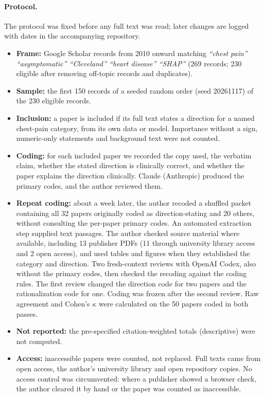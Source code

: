 \documentclass[11pt]{article}
\begin{document}
\paragraph{Protocol.}
The protocol was fixed before any full text was read; later changes are logged with dates in the accompanying repository.
\begin{itemize}
\item \textbf{Frame:} Google Scholar records from 2010 onward matching \textit{``chest pain'' ``asymptomatic'' ``Cleveland'' ``heart disease'' ``SHAP''} (269 records; 230 eligible after removing off-topic records and duplicates).
\item \textbf{Sample:} the first 150 records of a seeded random order (seed 20261117) of the 230 eligible records.
\item \textbf{Inclusion:} a paper is included if its full text states a direction for a named chest-pain category, from its own data or model. Importance without a sign, numeric-only statements and background text were not counted.
\item \textbf{Coding:} for each included paper we recorded the copy used, the verbatim claim, whether the stated direction is clinically correct, and whether the paper explains the direction clinically. Claude (Anthropic) produced the primary codes, and the author reviewed them.
\item \textbf{Repeat coding:} about a week later, the author recoded a shuffled packet containing all 32 papers originally coded as direction-stating and 20 others, without consulting the per-paper primary codes. An automated extraction step supplied text passages. The author checked source material where available, including 13 publisher PDFs (11 through university library access and 2 open access), and used tables and figures when they established the category and direction. Two fresh-context reviews with OpenAI Codex, also without the primary codes, then checked the recoding against the coding rules. The first review changed the direction code for two papers and the rationalization code for one. Coding was frozen after the second review. Raw agreement and Cohen's $\kappa$ were calculated on the 50 papers coded in both passes.
\item \textbf{Not reported:} the pre-specified citation-weighted totals (descriptive) were not computed.
\item \textbf{Access:} inaccessible papers were counted, not replaced. Full texts came from open access, the author's university library and open repository copies. No access control was circumvented: where a publisher showed a browser check, the author cleared it by hand or the paper was counted as inaccessible.
\end{itemize}
\end{document}
